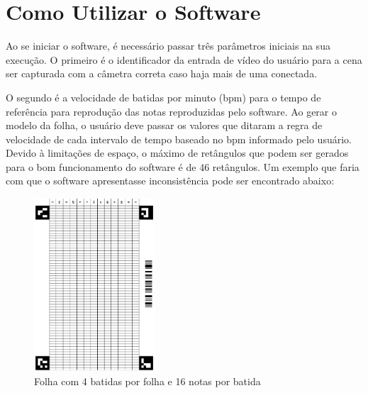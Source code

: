 \documentclass[12pt]{report}
\begin{document}

\chapter{Como Utilizar o Software}
\label{cha:cha6}

Ao se iniciar o software, é necessário passar três parâmetros iniciais na sua execução. O primeiro é o identificador da entrada de vídeo do usuário para a cena ser capturada com a câmetra correta caso haja mais de uma conectada.

O segundo é a velocidade de batidas por minuto (bpm) para o tempo de referência para reprodução das notas reproduzidas pelo software. Ao gerar o modelo da folha, o usuário deve passar os valores que ditaram a regra de velocidade de cada intervalo de tempo baseado no bpm informado pelo usuário. Devido à limitações de espaço, o máximo de retângulos que podem ser gerados para o bom funcionamento do software é de 46 retângulos. Um exemplo que faria com que o software apresentasse inconsistência pode ser encontrado abaixo:

\begin{figure}[H]
  \centering
    \includegraphics[angle=90,origin=c,width=0.4\textwidth]{imagens/416.png}
    \caption{Folha com 4 batidas por folha e 16 notas por batida}
  \label{fig:416}
\end{figure}
\end{document}

